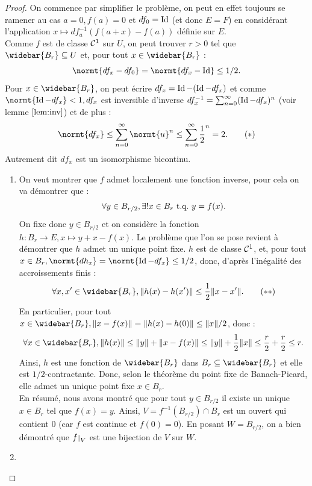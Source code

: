 \begin{proof}
On commence par simplifier le problème, on peut en effet toujours se ramener au cas $a=0, f(a)=0$ et $df_0 = \operatorname{Id}$ (et donc $E=F$)
en considérant l'application $x \mapsto df_a^{-1}(f(a+x) -f(a))$ définie sur $E$. \\
Comme $f$ est de classe $\mathcal{C}^1$ sur $U$, on peut trouver $r>0$ tel que $\widebar{B_r} \subset U$ et, pour tout $x \in \widebar{B_r}$ :
\[ \normt{df_x - df_0} = \normt{df_x - \id} \leq 1/2 . \]
Pour $x \in \widebar{B_r}$, on peut écrire $df_x = \operatorname{Id} - (\operatorname{Id} - df_x)$ et comme $\normt{\id - df_x} < 1, df_x$ est inversible d'inverse 
$df_x^{-1} = \sum_{n=0}^{\infty} (\operatorname{Id} - df_x)^n$ (voir lemme $\ref{lem:inv}$) et de plus :
\[ \normt{df_x} \leq \sum_{n=0}^{\infty} \normt{u}^n \leq \sum_{n=0}^{\infty} \dfrac12^n = 2 . \qquad (*) \]
Autrement dit $df_x$ est un isomorphisme bicontinu.

\begin{enumerate}[label=(\roman*)]

\item 

On veut montrer que $f$ admet localement une fonction inverse, pour cela on va démontrer que :
\[ \forall y \in B_{r/2}, \exists ! x \in B_r \text{~t.q.~} y=f(x). \]
On fixe donc $y \in B_{r/2}$ et on considère la fonction $h : B_r \to E, x \mapsto y + x - f(x)$. 
Le problème que l'on se pose revient à démontrer que $h$ admet un unique point fixe. 
$h$ est de classe $\mathcal{C}^1$, et, pour tout $x \in B_r, \normt{dh_x} = \normt{\id - df_x} \leq 1/2$, 
donc, d'après l'inégalité des accroissements finis :
\[ \forall x, x' \in \widebar{B_r}, \norm{h(x)-h(x')} \leq \dfrac12 \norm{x-x'} . \qquad (**) \]
En particulier, pour tout $x \in \widebar{B_r}, \norm{x-f(x)} = \norm{h(x) - h(0)} \leq \norm{x}/2$, donc :
\[ \forall x \in \widebar{B_r}, \norm{h(x)} \leq \norm{y} + \norm{x-f(x)} \leq \norm{y} + \dfrac12 \norm{x} 
	\leq \dfrac{r}2 +\dfrac{r}2 \leq r . \]
Ainsi, $h$ est une fonction de $\widebar{B_r}$ dans $B_r \subset \widebar{B_r}$ et elle est $1/2$-contractante. 
Donc, selon le théorème du point fixe de Banach-Picard, elle admet un unique point fixe $x \in B_r$. \\
En résumé, nous avons montré que pour tout $y \in B_{r/2}$ il existe un unique $x \in B_r$ tel que $f(x)=y$. 
Ainsi, $V = f^{-1}(B_{r/2}) \cap B_r$ est un ouvert qui contient $0$ (car $f$ est continue et $f(0)=0$). 
En posant $W = B_{r/2}$, on a bien démontré que $\restr{f}{V}$ est une bijection de $V$ sur $W$.

\item


\end{enumerate}
\end{proof}
